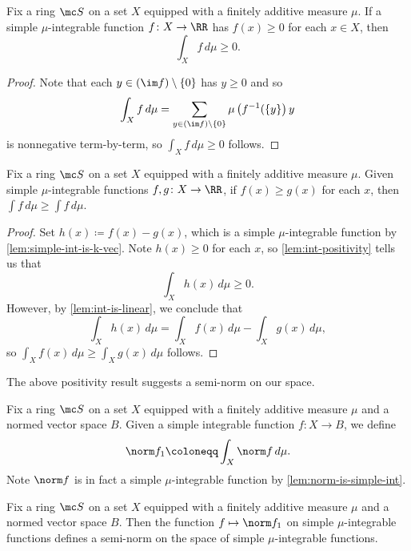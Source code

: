 \documentclass[../notes.tex]{subfiles}
\begin{document}
\begin{lemma} \label{lem:int-positivity}
	Fix a ring $\mc S$ on a set $X$ equipped with a finitely additive measure $\mu$. If a simple $\mu$-integrable function $f\colon X\to\RR$ has $f(x)\ge0$ for each $x\in X$, then
	\[\int_Xf\,d\mu\ge0.\]
\end{lemma}
\begin{proof}
	Note that each $y\in(\im f)\setminus\{0\}$ has $y\ge0$ and so
	\[\int_Xf\,d\mu=\sum_{y\in(\im f)\setminus\{0\}}\mu\left(f^{-1}(\{y\}\right)y\]
	is nonnegative term-by-term, so $\int_Xf\,d\mu\ge0$ follows.
\end{proof}
\begin{cor} \label{cor:bound-ints}
	Fix a ring $\mc S$ on a set $X$ equipped with a finitely additive measure $\mu$. Given simple $\mu$-integrable functions $f,g\colon X\to\RR$, if $f(x)\ge g(x)$ for each $x$, then $\int f\,d\mu\ge\int f\,d\mu$.
\end{cor}
\begin{proof}
	Set $h(x)\coloneqq f(x)-g(x)$, which is a simple $\mu$-integrable function by \autoref{lem:simple-int-is-k-vec}. Note $h(x)\ge0$ for each $x$, so \autoref{lem:int-positivity} tells us that
	\[\int_Xh(x)\,d\mu\ge0.\]
	However, by \autoref{lem:int-is-linear}, we conclude that
	\[\int_Xh(x)\,d\mu=\int_Xf(x)\,d\mu-\int_Xg(x)\,d\mu,\]
	so $\int_Xf(x)\,d\mu\ge\int_Xg(x)\,d\mu$ follows.
\end{proof}
The above positivity result suggests a semi-norm on our space.
\begin{notation}
	Fix a ring $\mc S$ on a set $X$ equipped with a finitely additive measure $\mu$ and a normed vector space $B$. Given a simple integrable function $f\colon X\to B$, we define
	\[\norm f_1\coloneqq\int_X\norm f\,d\mu.\]
	Note $\norm f$ is in fact a simple $\mu$-integrable function by \autoref{lem:norm-is-simple-int}.
\end{notation}
\begin{lemma}
	Fix a ring $\mc S$ on a set $X$ equipped with a finitely additive measure $\mu$ and a normed vector space $B$. Then the function $f\mapsto\norm f_1$ on simple $\mu$-integrable functions defines a semi-norm on the space of simple $\mu$-integrable functions.
\end{lemma}
\end{document}
